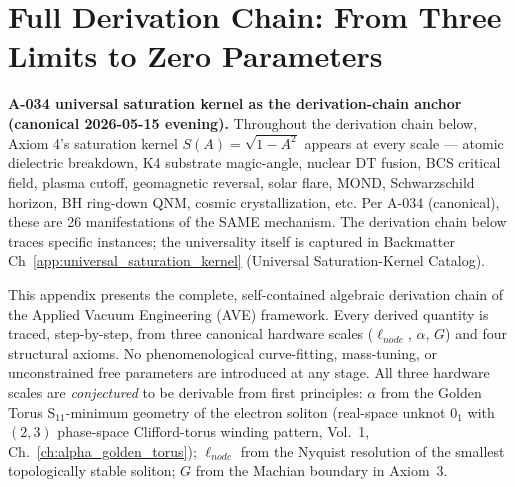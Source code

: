 
\chapter{Full Derivation Chain: From Three Limits to Zero Parameters}
\label{app:full_derivation_chain}

\textbf{A-034 universal saturation kernel as the derivation-chain anchor
(canonical 2026-05-15 evening).} Throughout the derivation chain below,
Axiom 4's saturation kernel $S(A) = \sqrt{1 - A^2}$ appears at every
scale --- atomic dielectric breakdown, K4 substrate magic-angle, nuclear
DT fusion, BCS critical field, plasma cutoff, geomagnetic reversal,
solar flare, MOND, Schwarzschild horizon, BH ring-down QNM, cosmic
crystallization, etc. Per A-034 (canonical), these are 26 manifestations
of the SAME mechanism. The derivation chain below traces specific
instances; the universality itself is captured in Backmatter
Ch~\ref{app:universal_saturation_kernel} (Universal Saturation-Kernel
Catalog).

This appendix presents the complete, self-contained algebraic derivation chain
of the Applied Vacuum Engineering (AVE) framework. Every derived quantity is
traced, step-by-step, from three canonical hardware scales ($\ell_{node}$, $\alpha$, $G$) and four
structural axioms. No phenomenological curve-fitting, mass-tuning, or
unconstrained free parameters are introduced at any stage. All three hardware
scales are \emph{conjectured} to be derivable from first principles: $\alpha$ from the Golden
Torus S$_{11}$-minimum geometry of the electron soliton (real-space unknot $0_1$ with $(2,3)$ phase-space Clifford-torus winding pattern, Vol.~1,
Ch.~\ref{ch:alpha_golden_torus}); $\ell_{node}$ from the Nyquist resolution of
the smallest topologically stable soliton; $G$ from the Machian boundary in
Axiom~3.

